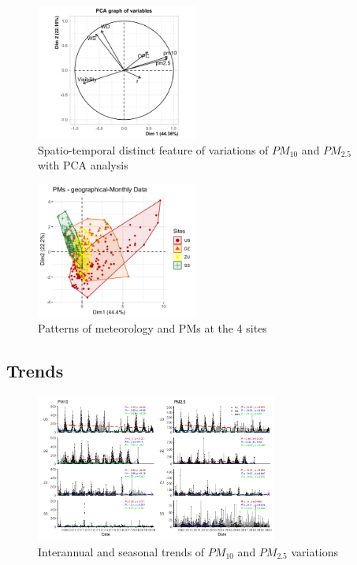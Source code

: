 \documentclass[
  11pt,
]{article}
\begin{document}
\newpage

\begin{figure}
\centering
\includegraphics[width=2.08333in,height=\textheight,keepaspectratio]{images/figure_7.png}
\caption{Spatio-temporal distinct feature of variations of \(PM_{10}\)
and \(PM_{2.5}\) with PCA analysis}
\end{figure}

\begin{figure}
\centering
\includegraphics[width=2.08333in,height=\textheight,keepaspectratio]{images/figure_7b.png}
\caption{Patterns of meteorology and PMs at the 4 sites}
\end{figure}

\newpage
\subsection{Trends}

\begin{figure}
\centering
\includegraphics[width=3.125in,height=\textheight,keepaspectratio]{images/figure_8.png}
\caption{Interannual and seasonal trends of \(PM_{10}\) and \(PM_{2.5}\)
variations}
\end{figure}
\end{document}
